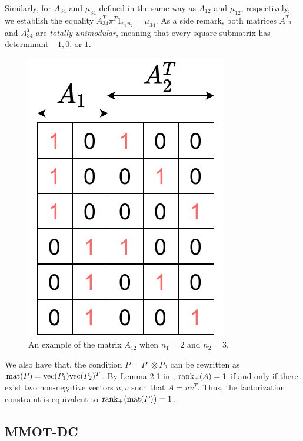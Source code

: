 Similarly, for $A_{34}$ and $\mu_{34}$ defined in the same way as $A_{12}$ and
$\mu_{12}$, respectively, we establish the equality $A_{34}^T \pi^T 1_{n_1 n_2} = \mu_{34}$.
As a side remark, both matrices $A_{12}^T$ and $A_{34}^T$ are \textit{totally unimodular},
meaning that every square submatrix has determinant $-1, 0$, or $1$.
\begin{figure}[h]
  \centering
  \includegraphics[height=0.25\textheight,keepaspectratio]{./Chapitre2/fig/matrix.pdf}
  \caption{An example of the matrix $A_{12}$ when $n_1=2$ and $n_2=3$.}
  \label{fig:matrix_a12}
\end{figure}

We also have that, the condition $P = P_1 \otimes P_2$ can be rewritten as
$\text{mat}(P) = \text{vec}(P_1) \text{vec}(P_2)^T$. By Lemma 2.1 in \citep{Joel93}, $\text{rank}_+(A) = 1$
if and only if there exist two non-negative vectors $u,v$ such that
$A = u v^T$. Thus, the factorization constraint is equivalent to
$\text{rank}_+\big( \text{mat}(P) \big) = 1$.

\subsection{MMOT-DC} \label{appendix:subsec_mmot_dc}

